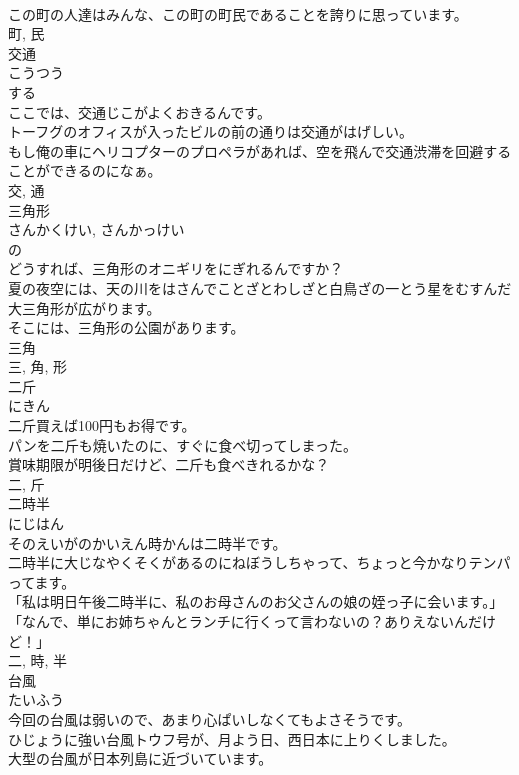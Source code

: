 \documentclass[8pt]{extreport}
\begin{document}
\begin{CJK}{UTF8}{min}
\\	この町の人達はみんな、この町の町民であることを誇りに思っています。	
\\	町, 民	
\\	交通	
\\	こうつう	
\\	する 
\\	ここでは、交通じこがよくおきるんです。	
\\	トーフグのオフィスが入ったビルの前の通りは交通がはげしい。	
\\	もし俺の車にヘリコプターのプロペラがあれば、空を飛んで交通渋滞を回避することができるのになぁ。	
\\	交, 通	
\\	三角形	
\\	さんかくけい, さんかっけい	
\\	の 
\\	どうすれば、三角形のオニギリをにぎれるんですか？	
\\	夏の夜空には、天の川をはさんでことざとわしざと白鳥ざの一とう星をむすんだ大三角形が広がります。	
\\	そこには、三角形の公園があります。	
\\	三角 
\\	三, 角, 形	
\\	二斤	
\\	にきん	
\\	二斤買えば100円もお得です。	
\\	パンを二斤も焼いたのに、すぐに食べ切ってしまった。	
\\	賞味期限が明後日だけど、二斤も食べきれるかな？	
\\	二, 斤	
\\	二時半	
\\	にじはん	
\\	そのえいがのかいえん時かんは二時半です。	
\\	二時半に大じなやくそくがあるのにねぼうしちゃって、ちょっと今かなりテンパってます。	
\\	「私は明日午後二時半に、私のお母さんのお父さんの娘の姪っ子に会います。」「なんで、単にお姉ちゃんとランチに行くって言わないの？ありえないんだけど！」	
\\	二, 時, 半	
\\	台風	
\\	たいふう	
\\	今回の台風は弱いので、あまり心ぱいしなくてもよさそうです。	
\\	ひじょうに強い台風トウフ号が、月よう日、西日本に上りくしました。	
\\	大型の台風が日本列島に近づいています。	

\end{CJK}
\end{document}
